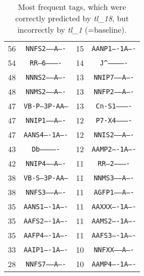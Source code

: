 \begin{table}[!h]
\begin{tabular}{|c|c||c|c|}
56  & \texttt{NNFS2-----A----} & 15 & \texttt{AANP1----1A----}                         \\
54  & \texttt{RR--6----------} & 14 & \texttt{J\textasciicircum -------------} \\
48  & \texttt{NNNS2-----A----} & 13 & \texttt{NNIP7-----A----}                         \\
48  & \texttt{NNMS2-----A----} & 13 & \texttt{NNFP2-----A----}                         \\
47  & \texttt{VB-P---3P-AA---} & 13 & \texttt{Cn-S1----------}                         \\
47  & \texttt{NNIP1-----A----} & 12 & \texttt{P7-X4----------}                         \\
47  & \texttt{AANS4----1A----} & 12 & \texttt{NNIS2-----A----}                         \\
43  & \texttt{Db-------------} & 12 & \texttt{AAMP2----1A----}                         \\
42  & \texttt{NNIP4-----A----} & 11 & \texttt{RR--2----------}                         \\
38  & \texttt{VB-S---3P-AA---} & 11 & \texttt{NNMS3-----A----}                         \\
38  & \texttt{NNFS3-----A----} & 11 & \texttt{AGFP1-----A----}                         \\
35  & \texttt{AANS1----1A----} & 11 & \texttt{AAXXX----1A----}                         \\
35  & \texttt{AAFS2----1A----} & 11 & \texttt{AAMS2----1A----}                         \\
35  & \texttt{AAFP4----1A----} & 11 & \texttt{AAFS3----1A----}                         \\
33  & \texttt{AAIP1----1A----} & 10 & \texttt{NNFXX-----A----}                         \\
28  & \texttt{NNFS7-----A----} & 10 & \texttt{AAMP4----1A----}                 \\ \hline       
\end{tabular}
\caption{Most frequent tags, which were correctly predicted by \textit{tl\_18}, but incorrectly by \textit{tl\_1} (=baseline).}
\end{table}

\newpage

